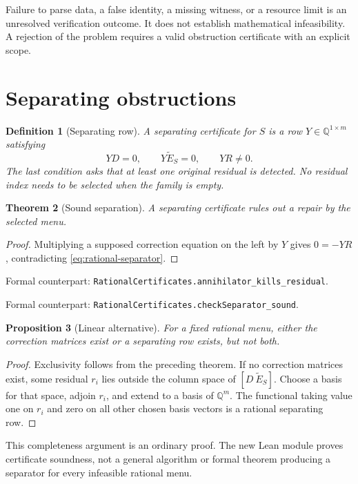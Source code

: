 \documentclass[11pt,letterpaper,oneside,openany]{book}
\theoremstyle{quiet}
\newtheorem{theorem}{Theorem}[chapter]
\newtheorem{proposition}[theorem]{Proposition}
\newtheorem{definition}[theorem]{Definition}
\newcommand{\Q}{\mathbb{Q}}
\newcommand{\formal}[1]{\par\nobreak\begingroup\footnotesize\color{Slate}\sffamily Formal counterpart: \normalfont\nolinkurl{#1}.\par\endgroup}
\newcommand{\sourcescope}[1]{\par\begingroup\small\color{Slate}#1\par\endgroup}
\begin{document}
\begin{scopebox}[title=A rejected certificate is not a rejected problem]
Failure to parse data, a false identity, a missing witness, or a resource limit is an unresolved verification outcome. It does not establish mathematical infeasibility. A rejection of the problem requires a valid obstruction certificate with an explicit scope.
\end{scopebox}

\section{Separating obstructions}
\begin{definition}[Separating row]
A separating certificate for $S$ is a row $Y\in\Q^{1\times m}$ satisfying
\begin{equation}\label{eq:rational-separator}
 YD=0,\qquad Y\widetilde E_S=0,\qquad YR\ne0.
\end{equation}
The last condition asks that at least one original residual is detected. No residual index needs to be selected when the family is empty.
\end{definition}

\begin{theorem}[Sound separation]\label{thm:rational-separation}
A separating certificate rules out a repair by the selected menu.
\end{theorem}
\begin{proof}
Multiplying a supposed correction equation on the left by $Y$ gives $0=-YR$, contradicting \eqref{eq:rational-separator}.
\end{proof}
\formal{RationalCertificates.annihilator_kills_residual}
\formal{RationalCertificates.checkSeparator_sound}

\begin{proposition}[Linear alternative]\label{prop:rational-alternative}
For a fixed rational menu, either the correction matrices exist or a separating row exists, but not both.
\end{proposition}
\begin{proof}
Exclusivity follows from the preceding theorem. If no correction matrices exist, some residual $r_i$ lies outside the column space of $[D\ \widetilde E_S]$. Choose a basis for that space, adjoin $r_i$, and extend to a basis of $\Q^m$. The functional taking value one on $r_i$ and zero on all other chosen basis vectors is a rational separating row.
\end{proof}
\sourcescope{This completeness argument is an ordinary proof. The new Lean module proves certificate soundness, not a general algorithm or formal theorem producing a separator for every infeasible rational menu.}
\end{document}
